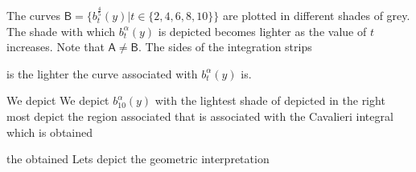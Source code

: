 \documentclass{article}
\theoremstyle{theorem}
\theoremstyle{definition}
\begin{document}
The curves $\mathsf{B} = \{b_{t}^{\frac{4}{5}}(y)|t\in\{2,4,6,8,10\}\}$ are plotted in different shades of grey. The shade with which $b_t^{\alpha}(y)$ is depicted becomes lighter as the value of $t$ increases. Note 
that $\mathsf{A}\neq \mathsf{B}$. The sides of the integration strips 


is the lighter the curve associated with $b_t^{\alpha}(y)$ is.

We depict We depict $b_10^{\alpha}(y)$ with the lightest
shade of
depicted in the right most   depict the region associated that is associated with the Cavalieri integral which is obtained 


the obtained Lets depict the geometric interpretation 






\end{document}
